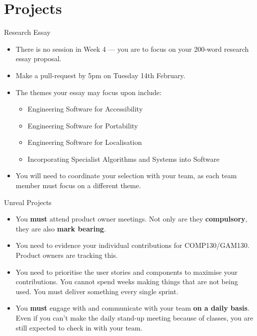 \part{Projects}
\frame{\partpage}

\begin{frame}{Research Essay}

	\begin{itemize}
		\item  There is no session in Week 4 --- you are to focus on your 200-word research essay proposal.
		\item  Make a pull-request by 5pm on Tuesday 14th February.
		\item  The themes your essay may focus upon include:
		\begin{itemize}
			\item  Engineering Software for Accessibility
			\item  Engineering Software for Portability
			\item  Engineering Software for Localisation
			\item  Incorporating Specialist Algorithms and Systems into Software
		\end{itemize}
		\item  You will need to coordinate your selection with your team, as each team member must focus on a different theme.
	\end{itemize}

\end{frame}

\begin{frame}{Unreal Projects}

	\begin{itemize}
		\item  You \textbf{must} attend product owner meetings. Not only are they \textbf{compulsory}, they are also \textbf{mark bearing}.
		\item  You need to evidence your individual contributions for COMP130/GAM130. Product owners are tracking this.
		\item  You need to prioritise the user stories and components to maximise your contributions. You cannot spend weeks making things that are not being used. You must deliver something every single sprint.
		\item  You \textbf{must} engage with and communicate with your team \textbf{on a daily basis}. Even if you can't make the daily stand-up meeting because of classes, you are still expected to check in with your team.
	\end{itemize}
	
\end{frame}


